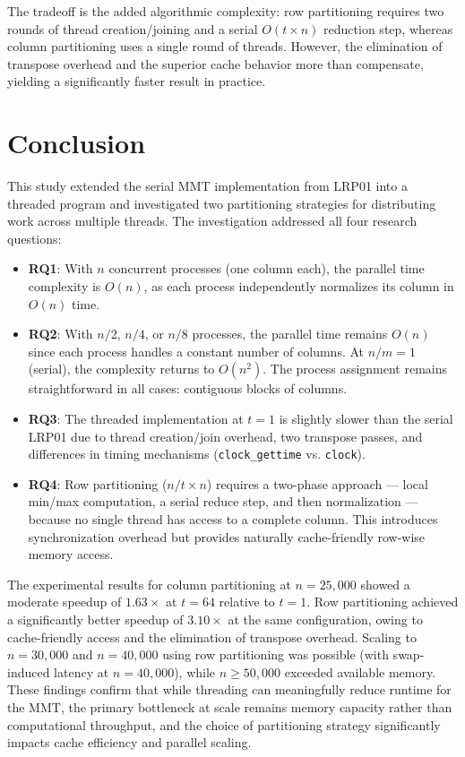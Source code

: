 \documentclass[journal]{IEEEtran}
\begin{document}
The tradeoff is the added algorithmic complexity: row partitioning requires two
rounds of thread creation/joining and a serial $O(t \times n)$ reduction step,
whereas column partitioning uses a single round of threads. However, the
elimination of transpose overhead and the superior cache behavior more than
compensate, yielding a significantly faster result in practice.

\section{Conclusion}

This study extended the serial MMT implementation from LRP01 into a threaded program and investigated two partitioning strategies for distributing work across multiple threads. The investigation addressed all four research questions:

\begin{itemize}
    \item \textbf{RQ1}: With $n$ concurrent processes (one column each), the parallel time complexity is $O(n)$, as each process independently normalizes its column in $O(n)$ time.
    
    \item \textbf{RQ2}: With $n/2$, $n/4$, or $n/8$ processes, the parallel time remains $O(n)$ since each process handles a constant number of columns. At $n/m = 1$ (serial), the complexity returns to $O(n^2)$. The process assignment remains straightforward in all cases: contiguous blocks of columns.
    
    \item \textbf{RQ3}: The threaded implementation at $t = 1$ is slightly slower than the serial LRP01 due to thread creation/join overhead, two transpose passes, and differences in timing mechanisms (\texttt{clock\_gettime} vs. \texttt{clock}).
    
    \item \textbf{RQ4}: Row partitioning ($n/t \times n$) requires a two-phase approach --- local min/max computation, a serial reduce step, and then normalization --- because no single thread has access to a complete column. This introduces synchronization overhead but provides naturally cache-friendly row-wise memory access.
\end{itemize}

The experimental results for column partitioning at $n = 25{,}000$ showed a moderate speedup of $1.63\times$ at $t = 64$ relative to $t = 1$. Row partitioning achieved a significantly better speedup of $3.10\times$ at the same configuration, owing to cache-friendly access and the elimination of transpose overhead. Scaling to $n = 30{,}000$ and $n = 40{,}000$ using row partitioning was possible (with swap-induced latency at $n = 40{,}000$), while $n \geq 50{,}000$ exceeded available memory. These findings confirm that while threading can meaningfully reduce runtime for the MMT, the primary bottleneck at scale remains memory capacity rather than computational throughput, and the choice of partitioning strategy significantly impacts cache efficiency and parallel scaling.
\end{document}
